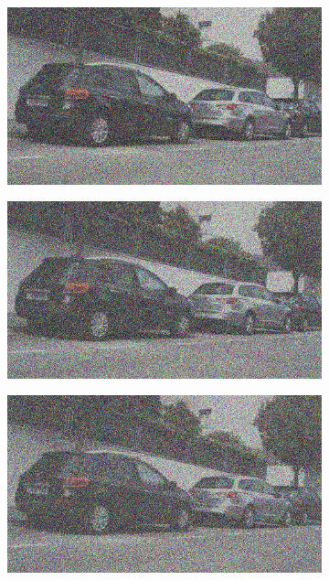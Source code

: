 \documentclass[a4paper]{ctexart}
\begin{document}
\begin{figure}[htbp]
\begin{subfigure}{0.08\textwidth}
				\label{fig：Gamma=0.5, Gauss Noise = 0.7}
			\end{subfigure}
			\begin{subfigure}{0.08\textwidth}
				\captionsetup{font=scriptsize}
				\includegraphics[width=\linewidth]{picture/Edge Detection/degrade/RGB_001 Gamma=0.5, Gauss Noise=0.8}
				\label{fig：Gamma=0.5, Gauss Noise = 0.8}
			\end{subfigure}
			\begin{subfigure}{0.08\textwidth}
				\captionsetup{font=scriptsize}
				\includegraphics[width=\linewidth]{picture/Edge Detection/degrade/RGB_001 Gamma=0.5, Gauss Noise=0.9}
				\label{fig：Gamma=0.5, Gauss Noise = 0.9}
			\end{subfigure}
			\begin{subfigure}{0.08\textwidth}
				\captionsetup{font=scriptsize}
				\includegraphics[width=\linewidth]{picture/Edge Detection/degrade/RGB_001 Gamma=0.5, Gauss Noise=1.0}

\end{subfigure}
\end{figure}
\end{document}
